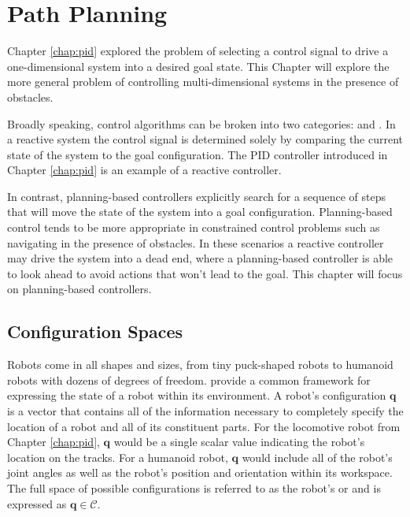 
\chapter{Path Planning}
\label{chap:planning}


Chapter \ref{chap:pid} explored the problem of selecting a control
signal to drive a one-dimensional system into a desired goal state.
This Chapter will explore the more general problem of controlling
multi-dimensional systems in the presence of obstacles.

Broadly speaking, control algorithms can be broken into two
categories:  and .  In a
reactive system the control signal is determined solely by comparing
the current state of the system to the goal configuration. The PID
controller introduced in Chapter \ref{chap:pid} is an example of a reactive
controller.

In contrast, planning-based controllers explicitly search for a
sequence of steps that will move the state of the system into a goal
configuration. Planning-based control tends to be more appropriate in
constrained control problems such as navigating in the presence of
obstacles.  In these scenarios a reactive controller may drive the
system into a dead end, where a planning-based controller is able to
look ahead to avoid actions that won't lead to the goal.  This chapter
will focus on planning-based controllers.


\section{Configuration Spaces}

Robots come in all shapes and sizes, from tiny puck-shaped robots to
humanoid robots with dozens of degrees of freedom.
 provide a common framework for expressing
the state of a robot within its environment.  A robot's configuration
$\mathbf{q}$ is a vector that contains all of the information
necessary to completely specify the location of a robot and all of its
constituent parts.  For the locomotive robot from Chapter \ref{chap:pid},
$\mathbf{q}$ would be a single scalar value indicating the robot's
location on the tracks.  For a humanoid robot, $\mathbf{q}$ would
include all of the robot's joint angles as well as the robot's
position and orientation within its workspace.  The full space of
possible configurations is referred to as the robot's
 or  and is expressed as
$\mathbf{q} \in \mathcal{C}$.


